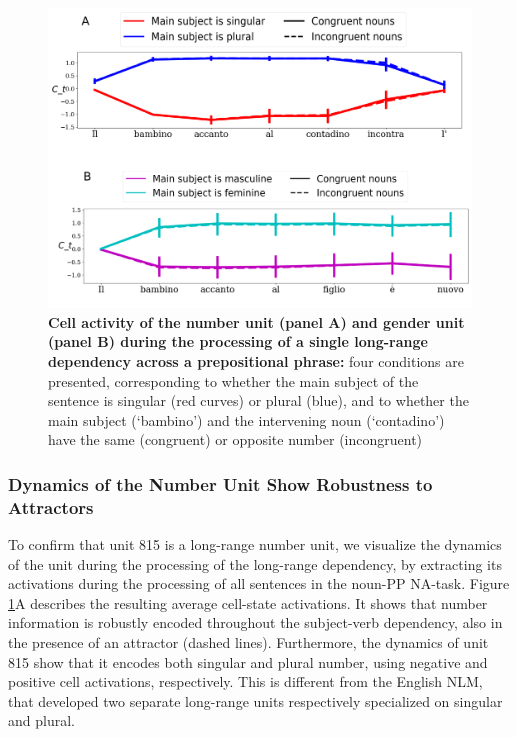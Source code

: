 \begin{figure}[t!]
    \centering
    \includegraphics[width=\textwidth]{figures/model_activations_nounpp.png}
    \caption{\textbf{Cell activity of the number unit (panel A) and gender unit (panel B) during the processing of a single long-range dependency across a prepositional phrase:} four conditions are presented, corresponding to whether the main subject of the sentence is singular (red curves) or plural (blue), and to whether the main subject (`bambino') and the intervening noun (`contadino') have the same (congruent) or opposite number (incongruent)}
    \label{fig:nounpp}
\end{figure} 

\subsubsection{Dynamics of the Number Unit Show Robustness to Attractors} 
To confirm that unit 815 is a long-range number unit, we visualize the dynamics of the unit during the processing of the long-range dependency, by extracting its activations during the processing of all sentences in the noun-PP NA-task. Figure \ref{fig:nounpp}A describes the resulting average cell-state activations. It shows that number information is robustly encoded throughout the subject-verb dependency, also in the presence of an attractor (dashed lines). Furthermore, the dynamics of unit 815 show that it encodes both singular and plural number, using negative and positive cell activations, respectively. This is different from the English NLM, that developed two separate long-range units respectively specialized on singular and plural.

